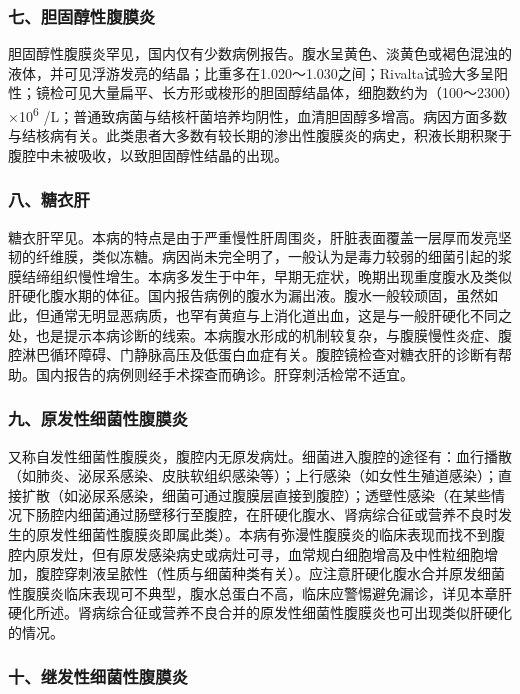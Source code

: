 \subsubsection{七、胆固醇性腹膜炎}

胆固醇性腹膜炎罕见，国内仅有少数病例报告。腹水呈黄色、淡黄色或褐色混浊的液体，并可见浮游发亮的结晶；比重多在1.020～1.030之间；Rivalta试验大多呈阳性；镜检可见大量扁平、长方形或梭形的胆固醇结晶体，细胞数约为（100～2300）×10\textsuperscript{6}
/L；普通致病菌与结核杆菌培养均阴性，血清胆固醇多增高。病因方面多数与结核病有关。此类患者大多数有较长期的渗出性腹膜炎的病史，积液长期积聚于腹腔中未被吸收，以致胆固醇性结晶的出现。

\subsubsection{八、糖衣肝}

糖衣肝罕见。本病的特点是由于严重慢性肝周围炎，肝脏表面覆盖一层厚而发亮坚韧的纤维膜，类似冻糖。病因尚未完全明了，一般认为是毒力较弱的细菌引起的浆膜结缔组织慢性增生。本病多发生于中年，早期无症状，晚期出现重度腹水及类似肝硬化腹水期的体征。国内报告病例的腹水为漏出液。腹水一般较顽固，虽然如此，但通常无明显恶病质，也罕有黄疸与上消化道出血，这是与一般肝硬化不同之处，也是提示本病诊断的线索。本病腹水形成的机制较复杂，与腹膜慢性炎症、腹腔淋巴循环障碍、门静脉高压及低蛋白血症有关。腹腔镜检查对糖衣肝的诊断有帮助。国内报告的病例则经手术探查而确诊。肝穿刺活检常不适宜。

\subsubsection{九、原发性细菌性腹膜炎}

又称自发性细菌性腹膜炎，腹腔内无原发病灶。细菌进入腹腔的途径有：血行播散（如肺炎、泌尿系感染、皮肤软组织感染等）；上行感染（如女性生殖道感染）；直接扩散（如泌尿系感染，细菌可通过腹膜层直接到腹腔）；透壁性感染（在某些情况下肠腔内细菌通过肠壁移行至腹腔，在肝硬化腹水、肾病综合征或营养不良时发生的原发性细菌性腹膜炎即属此类）。本病有弥漫性腹膜炎的临床表现而找不到腹腔内原发灶，但有原发感染病史或病灶可寻，血常规白细胞增高及中性粒细胞增加，腹腔穿刺液呈脓性（性质与细菌种类有关）。应注意肝硬化腹水合并原发细菌性腹膜炎临床表现可不典型，腹水总蛋白不高，临床应警惕避免漏诊，详见本章肝硬化所述。肾病综合征或营养不良合并的原发性细菌性腹膜炎也可出现类似肝硬化的情况。

\subsubsection{十、继发性细菌性腹膜炎}

